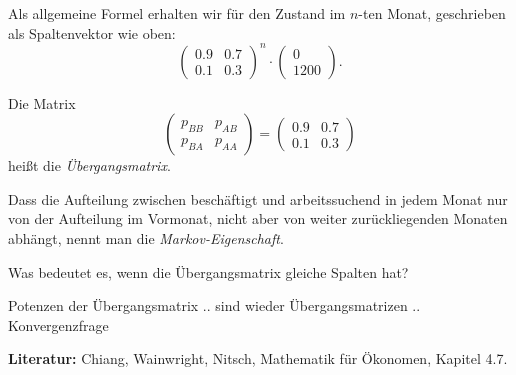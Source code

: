 \documentclass{ximera}
\begin{document}
Als allgemeine Formel erhalten wir für den Zustand im $n$-ten Monat, geschrieben als Spaltenvektor wie oben:
\[
\left(
\begin{array}{cc}
0.9 & 0.7 \\
0.1 & 0.3    
\end{array}
\right)^n \cdot \left(
\begin{array}{c}
0 \\ 1200    
\end{array}
\right).
\]

Die Matrix 
\[
\left(
\begin{array}{cc}
p_{BB} & p_{AB} \\
p_{BA} & p_{AA}    
\end{array}
\right) = 
\left(
\begin{array}{cc}
0.9 & 0.7 \\
0.1 & 0.3    
\end{array}
\right)
\]
heißt die \emph{Übergangsmatrix}.

Dass die Aufteilung zwischen beschäftigt und arbeitssuchend in jedem Monat nur von der Aufteilung im Vormonat, nicht aber von weiter zurückliegenden Monaten abhängt, nennt man die \emph{Markov-Eigenschaft}.


Was bedeutet es, wenn die Übergangsmatrix gleiche Spalten hat?

Potenzen der Übergangsmatrix
 .. sind wieder Übergangsmatrizen
 .. Konvergenzfrage



\textbf{Literatur:} Chiang, Wainwright, Nitsch, Mathematik für Ökonomen, Kapitel 4.7.
\end{document}
